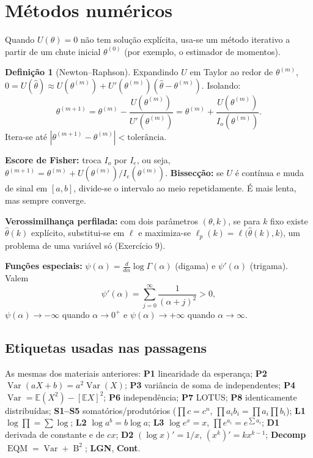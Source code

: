\documentclass[11pt,a4paper]{article}
\newcommand{\E}{\mathbb{E}}
\newcommand{\Var}{\operatorname{Var}}
\newcommand{\EQM}{\operatorname{EQM}}
\newcommand{\B}{\operatorname{B}}
\theoremstyle{definition}
\newtheorem{definicao}{Definição}[section]
\theoremstyle{plain}
\begin{document}
\section{Métodos numéricos}

Quando $U(\theta)=0$ não tem solução explícita, usa-se um método iterativo a partir de um chute inicial $\theta^{(0)}$ (por exemplo, o estimador de momentos).

\begin{definicao}[Newton--Raphson]
Expandindo $U$ em Taylor ao redor de $\theta^{(m)}$, $0=U(\hat\theta)\approx U(\theta^{(m)})+U'(\theta^{(m)})(\hat\theta-\theta^{(m)})$. Isolando:
\[
\theta^{(m+1)}=\theta^{(m)}-\frac{U(\theta^{(m)})}{U'(\theta^{(m)})}=\theta^{(m)}+\frac{U(\theta^{(m)})}{I_o(\theta^{(m)})}.
\]
Itera-se até $|\theta^{(m+1)}-\theta^{(m)}|<\text{tolerância}$.
\end{definicao}

\textbf{Escore de Fisher:} troca $I_o$ por $I_e$, ou seja, $\theta^{(m+1)}=\theta^{(m)}+U(\theta^{(m)})/I_e(\theta^{(m)})$. \textbf{Bissecção:} se $U$ é contínua e muda de sinal em $[a,b]$, divide-se o intervalo ao meio repetidamente. É mais lenta, mas sempre converge.

\textbf{Verossimilhança perfilada:} com dois parâmetros $(\theta,k)$, se para $k$ fixo existe $\hat\theta(k)$ explícito, substitui-se em $\ell$ e maximiza-se $\ell_p(k)=\ell\big(\hat\theta(k),k\big)$, um problema de uma variável só (Exercício 9).

\textbf{Funções especiais:} $\psi(\alpha)=\frac{d}{d\alpha}\log\Gamma(\alpha)$ (digama) e $\psi'(\alpha)$ (trigama). Valem
\[\psi'(\alpha)=\sum_{j=0}^\infty\frac{1}{(\alpha+j)^2}>0,\] $\psi(\alpha)\to-\infty$ quando $\alpha\to0^+$ e $\psi(\alpha)\to+\infty$ quando $\alpha\to\infty$.

\subsection*{Etiquetas usadas nas passagens}
As mesmas dos materiais anteriores: \textbf{P1} linearidade da esperança; \textbf{P2} $\Var(aX+b)=a^2\Var(X)$; \textbf{P3} variância de soma de independentes; \textbf{P4} $\Var=\E(X^2)-[\E X]^2$; \textbf{P6} independência; \textbf{P7} LOTUS; \textbf{P8} identicamente distribuídas; \textbf{S1--S5} somatórios/produtórios ($\prod c=c^n$, $\prod a_ib_i=\prod a_i\prod b_i$); \textbf{L1} $\log\prod=\sum\log$; \textbf{L2} $\log a^b=b\log a$; \textbf{L3} $\log e^x=x$, $\prod e^{a_i}=e^{\sum a_i}$; \textbf{D1} derivada de constante e de $cx$; \textbf{D2} $(\log x)'=1/x$, $(x^k)'=kx^{k-1}$; \textbf{Decomp} $\EQM=\Var+\B^2$; \textbf{LGN}, \textbf{Cont}.
\end{document}
